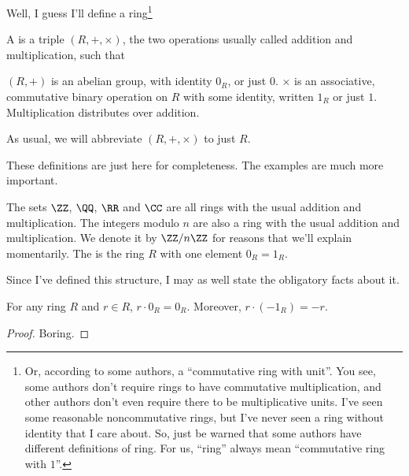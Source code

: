 Well, I guess I'll define a ring\footnote{Or, according to some authors, a ``commutative ring with unit''.
You see, some authors don't require rings to have commutative multiplication, and other authors don't
even require there to be multiplicative units. I've seen some reasonable noncommutative rings,
but I've never seen a ring without identity that I care about. So, just be warned that
some authors have different definitions of ring. For us, ``ring'' always mean ``commutative ring with $1$''.}
\begin{definition}
	A  is a triple $(R, +, \times)$, the two operations usually called addition and multiplication, such that
	\begin{enumerate}[(i)]
		\ii $(R,+)$ is an abelian group, with identity $0_R$, or just $0$.
		\ii $\times$ is an associative, commutative binary operation on $R$ with some
		identity, written $1_R$ or just $1$.
		\ii Multiplication distributes over addition.
	\end{enumerate}
\end{definition}
\begin{abuse}
	As usual, we will abbreviate $(R, +, \times)$ to just $R$.
\end{abuse}

These definitions are just here for completeness.
The examples are much more important.
\begin{example}
	\listhack
	\begin{enumerate}[(a)]
		\ii The sets $\ZZ$, $\QQ$, $\RR$ and $\CC$ are all rings
		with the usual addition and multiplication.
		\ii The integers modulo $n$ are also a ring
		with the usual addition and multiplication.
		We denote it by $\ZZ / n\ZZ$ for reasons that we'll explain momentarily.
		\ii The  is the ring $R$ with one element $0_R = 1_R$.
	\end{enumerate}
\end{example}

Since I've defined this structure, I may as well state the obligatory facts about it.
\begin{fact}
	For any ring $R$ and $r \in R$, $r \cdot 0_R = 0_R$.
	Moreover, $r \cdot (-1_R) = -r$.
\end{fact}
\begin{proof}
	Boring.
\end{proof}

